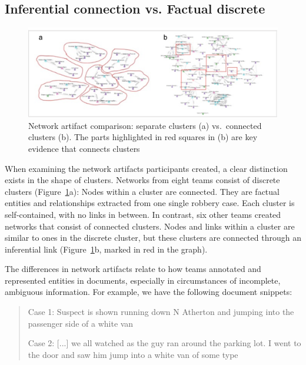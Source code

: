 \subsection{Inferential connection vs. Factual discrete}

\begin{figure}
	\centering
	\includegraphics[width=\columnwidth]{04-Study_one/img/network_cluster.png}
	\caption{Network artifact comparison: separate clusters (a)
		vs.~connected clusters (b). The parts highlighted in red squares in (b) are key
		evidence that connects clusters\label{fig:network_cluster}}
\end{figure}

When examining the network artifacts participants created, a clear distinction exists in the shape of clusters. Networks from eight teams consist of discrete clusters
(Figure~\ref{fig:network_cluster}a): Nodes within a cluster are
connected. They are factual entities and relationships extracted from one single robbery case.  Each cluster is self-contained, with no links in between. In contrast, six other teams created networks that consist of connected clusters. Nodes and links within a cluster are similar to ones in the discrete cluster, but these clusters are connected through an
inferential link (Figure~\ref{fig:network_cluster}b, marked in red in the graph).

The differences in network artifacts relate to how teams annotated and represented entities in documents, especially in circumstances of incomplete, ambiguous information. For example, we have the following document snippets:

\begin{quote}
	Case 1: Suspect is shown running down N Atherton and jumping into the passenger side of a white van
	
	Case 2: [...] we all watched as the guy ran around the parking lot. I went to the door and saw him jump into a white van of some type
\end{quote}

